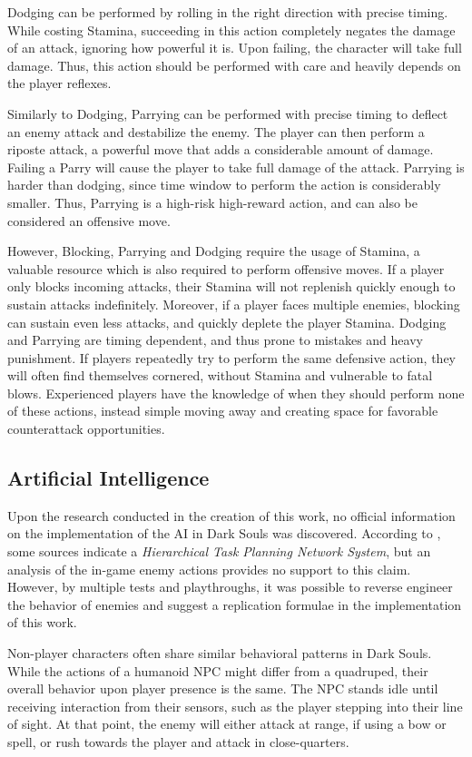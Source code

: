 \documentclass[cic,tc,english]{iiufrgs}
\begin{document}
Dodging can be performed by rolling in the right direction with precise timing. While costing Stamina, succeeding in this action completely negates the damage of an attack, ignoring how powerful it is. Upon failing, the character will take full damage. Thus, this action should be performed with care and heavily depends on the player reflexes.

Similarly to Dodging, Parrying can be performed with precise timing to deflect an enemy attack and destabilize the enemy. The player can then perform a riposte attack, a powerful move that adds a considerable amount of damage. Failing a Parry will cause the player to take full damage of the attack. Parrying is harder than dodging, since time window to perform the action is considerably smaller. Thus, Parrying is a high-risk high-reward action, and can also be considered an offensive move.

However, Blocking, Parrying and Dodging require the usage of Stamina, a valuable resource which is also required to perform offensive moves. If a player only blocks incoming attacks, their Stamina will not replenish quickly enough to sustain attacks indefinitely. Moreover, if a player faces multiple enemies, blocking can sustain even less attacks, and quickly deplete the player Stamina. Dodging and Parrying are timing dependent, and thus prone to mistakes and heavy punishment. If players repeatedly try to perform the same defensive action, they will often find themselves cornered, without Stamina and vulnerable to fatal blows. Experienced players have the knowledge of when they should perform none of these actions, instead simple moving away and creating space for favorable counterattack opportunities.

\subsection{Artificial Intelligence}

Upon the research conducted in the creation of this work, no official information on the implementation of the AI in Dark Souls was discovered. According to , some sources indicate a \emph{Hierarchical Task Planning Network System}, but an analysis of the in-game enemy actions provides no support to this claim. However, by multiple tests and playthroughs, it was possible to reverse engineer the behavior of enemies and suggest a replication formulae in the implementation of this work.

Non-player characters often share similar behavioral patterns in Dark Souls. While the actions of a humanoid NPC might differ from a quadruped, their overall behavior upon player presence is the same. The NPC stands idle until receiving interaction from their sensors, such as the player stepping into their line of sight. At that point, the enemy will either attack at range, if using a bow or spell, or rush towards the player and attack in close-quarters.
\end{document}
